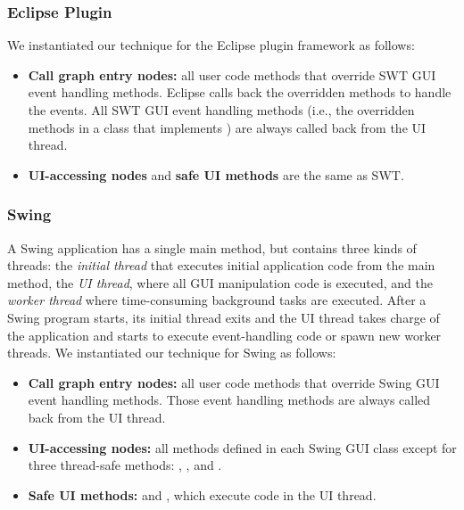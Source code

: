 \tinystep
\tinystep
\subsubsection{Eclipse Plugin}

We instantiated our technique for the Eclipse plugin framework as follows:

\preitemizespace

\begin{itemize}

\item \textbf{Call graph entry nodes:}  all user code methods that override
 SWT GUI event handling methods. Eclipse
calls back the overridden methods to handle the
events. All SWT GUI event handling methods (i.e., the overridden
methods in a class that implements ) are
always called back from the UI thread.

\tinystep

\item \textbf{UI-accessing nodes} and \textbf{safe UI methods} are the same as SWT\@.

\end{itemize}

\tinystep
\tinystep
\tinystep
\subsubsection{Swing}

A Swing application has a single main method, but contains three kinds of
threads: the \textit{initial thread} that executes initial application code from the main method,
the \textit{UI thread}, where all GUI manipulation code is executed,
and the \textit{worker thread} where time-consuming background tasks are executed.
After a Swing program starts, its initial thread exits and the UI thread takes charge
of the application and starts to execute event-handling code or spawn new worker threads. 
We instantiated our technique for Swing as follows:

\preitemizespace

\begin{itemize}

\item \textbf{Call graph entry nodes:} all user code methods that override
Swing GUI event handling methods. Those event handling methods are always
called back from the UI thread.

\tinystep

\item \textbf{UI-accessing nodes:} %
all methods defined in each Swing GUI class except for three thread-safe
methods: , , and .

\tinystep

\item \textbf{Safe UI methods:}  
 and , which execute code in the UI thread.

\end{itemize}


